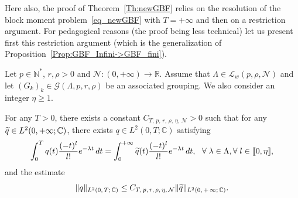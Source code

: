 \documentclass[10pt]{amsart}
\theoremstyle{definition}\newtheorem{defi}[theo]{Definition}\newtheorem{rema}[theo]{Remark}\newtheorem{exam}[theo]{Example}\newtheorem{exem}[theo]{Example}\newtheorem{nota}[theo]{Notation}
\newcommand{\llbracket}{\mathopen{[\mkern -2.7mu[}}
\newcommand{\rrbracket}{\mathclose{]\mkern -2.7mu]}}
\newcommand{\inter}[2]{\llbracket #1,#2 \rrbracket}
\newcommand{\LL}{\mathcal{L}}
\newcommand{\NN}{\mathcal{N}}
\newcommand{\N}{\mathbb{N}}
\newcommand{\R}{\mathbb{R}}
\newcommand{\C}{\mathbb{C}}
\let\oldtilde\tilde
\renewcommand*{\tilde}[1]{\mathchoice{\widetilde{#1}}{\widetilde{#1}}{\oldtilde{#1}}{\oldtilde{#1}}}\let\oldexists\exists
\renewcommand*{\exists}{\mathrel{\oldexists}}
\let\oldforall\forall
\renewcommand*{\forall}{\mathrel{\oldforall}}
\begin{document}
Here also, the proof of Theorem~\ref{Th:newGBF} relies on the resolution of the block moment problem~\eqref{eq_newGBF} with $T=+\infty$ and then on a restriction argument. For pedagogical reasons (the proof being less technical) let us present first this restriction argument (which is the generalization of Proposition~\ref{Prop:GBF_Infini->GBF_fini}).

\begin{prop}\label{Prop:newGBF_Infini->GBF_fini}
Let $p \in \N^*$, $r, \rho > 0$ and $\NN : (0,+\infty) \to \R$. Assume that $\Lambda \in \LL_w(p,\rho, \NN)$ and let $(G_k)_k\in \mathcal{G}(\Lambda,p,r,\rho)$ be an associated grouping. We also consider an integer $\eta\geq 1$.

For any $T>0$, there exists a constant $C_{T,\, p,\, r,\, \rho,\, \eta,\, \NN} >0$ such that for any $\tilde{q}\in L^2(0,+\infty;\C)$, there exists $q\in L^2(0,T;\C)$ satisfying
\[
\int_0^{T} q(t) \frac{(-t)^l}{l!} e^{-\lambda t} \, dt = \int_0^{+\infty} \tilde{q}(t) \frac{(-t)^l}{l!} e^{-\lambda t} \, dt, \ \ \forall \lambda\in \Lambda, \forall l\in \inter{0}{\eta},
\]
and the estimate
\[
\|q\|_{L^2(0,\,T;\,\C)}\leq C_{T,\, p,\, r,\, \rho, \,\eta,\, \NN} \|\tilde{q}\|_{L^2(0,\,+\,\infty;\,\C)}.
\]
\end{prop}
\end{document}
